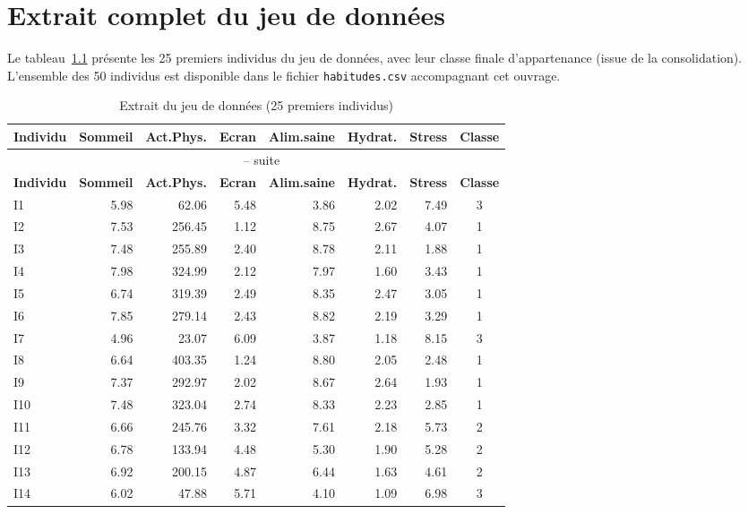 \documentclass[11pt,a4paper,oneside]{book}
\begin{document}
\appendix
\chapter{Extrait complet du jeu de données}

Le tableau~\ref{tab:annexeA} présente les 25 premiers individus du jeu de données, avec leur classe finale d'appartenance (issue de la consolidation). L'ensemble des 50 individus est disponible dans le fichier \texttt{habitudes.csv} accompagnant cet ouvrage.

\begin{longtable}{@{}lrrrrrrc@{}}
\caption{Extrait du jeu de données (25 premiers individus)}\label{tab:annexeA}\\
\toprule
\textbf{Individu} & \textbf{Sommeil} & \textbf{Act.Phys.} & \textbf{Ecran} & \textbf{Alim.saine} & \textbf{Hydrat.} & \textbf{Stress} & \textbf{Classe} \\
\midrule
\endfirsthead
\multicolumn{8}{c}{\tablename\ \thetable{} -- suite}\\
\toprule
\textbf{Individu} & \textbf{Sommeil} & \textbf{Act.Phys.} & \textbf{Ecran} & \textbf{Alim.saine} & \textbf{Hydrat.} & \textbf{Stress} & \textbf{Classe} \\
\midrule
\endhead
\bottomrule
\endfoot
I1  & 5.98 & 62.06  & 5.48 & 3.86 & 2.02 & 7.49 & 3 \\
I2  & 7.53 & 256.45 & 1.12 & 8.75 & 2.67 & 4.07 & 1 \\
I3  & 7.48 & 255.89 & 2.40 & 8.78 & 2.11 & 1.88 & 1 \\
I4  & 7.98 & 324.99 & 2.12 & 7.97 & 1.60 & 3.43 & 1 \\
I5  & 6.74 & 319.39 & 2.49 & 8.35 & 2.47 & 3.05 & 1 \\
I6  & 7.85 & 279.14 & 2.43 & 8.82 & 2.19 & 3.29 & 1 \\
I7  & 4.96 & 23.07  & 6.09 & 3.87 & 1.18 & 8.15 & 3 \\
I8  & 6.64 & 403.35 & 1.24 & 8.80 & 2.05 & 2.48 & 1 \\
I9  & 7.37 & 292.97 & 2.02 & 8.67 & 2.64 & 1.93 & 1 \\
I10 & 7.48 & 323.04 & 2.74 & 8.33 & 2.23 & 2.85 & 1 \\
I11 & 6.66 & 245.76 & 3.32 & 7.61 & 2.18 & 5.73 & 2 \\
I12 & 6.78 & 133.94 & 4.48 & 5.30 & 1.90 & 5.28 & 2 \\
I13 & 6.92 & 200.15 & 4.87 & 6.44 & 1.63 & 4.61 & 2 \\
I14 & 6.02 & 47.88  & 5.71 & 4.10 & 1.09 & 6.98 & 3 \\

\end{longtable}
\end{document}
